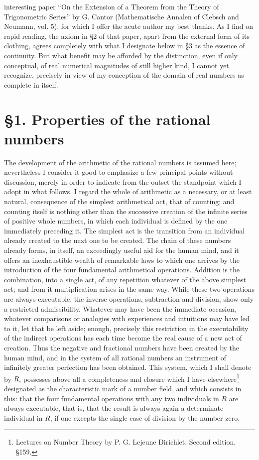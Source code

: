 \documentclass[11pt]{article}
\begin{document}
interesting paper ``On the Extension of a Theorem from the Theory of Trigonometric Series'' by G. Cantor (Mathematische Annalen of Clebsch and Neumann, vol. 5), for which I offer the acute author my best thanks. As I find on rapid reading, the axiom in \S 2 of that paper, apart from the external form of its clothing, agrees completely with what I designate below in \S 3 as the essence of continuity. But what benefit may be afforded by the distinction, even if only conceptual, of real numerical magnitudes of still higher kind, I cannot yet recognize, precisely in view of my conception of the domain of real numbers as complete in itself.

\section*{\S 1. Properties of the rational numbers}

The development of the arithmetic of the rational numbers is assumed here; nevertheless I consider it good to emphasize a few principal points without discussion, merely in order to indicate from the outset the standpoint which I adopt in what follows. I regard the whole of arithmetic as a necessary, or at least natural, consequence of the simplest arithmetical act, that of counting; and counting itself is nothing other than the successive creation of the infinite series of positive whole numbers, in which each individual is defined by the one immediately preceding it. The simplest act is the transition from an individual already created to the next one to be created. The chain of these numbers already forms, in itself, an exceedingly useful aid for the human mind, and it offers an inexhaustible wealth of remarkable laws to which one arrives by the introduction of the four fundamental arithmetical operations. Addition is the combination, into a single act, of any repetition whatever of the above simplest act; and from it multiplication arises in the same way. While these two operations are always executable, the inverse operations, subtraction and division, show only a restricted admissibility. Whatever may have been the immediate occasion, whatever comparisons or analogies with experiences and intuitions may have led to it, let that be left aside; enough, precisely this restriction in the executability of the indirect operations has each time become the real cause of a new act of creation. Thus the negative and fractional numbers have been created by the human mind, and in the system of all rational numbers an instrument of infinitely greater perfection has been obtained. This system, which I shall denote by $R$, possesses above all a completeness and closure which I have elsewhere\footnote{Lectures on Number Theory by P. G. Lejeune Dirichlet. Second edition. \S 159.} designated as the characteristic mark of a number field, and which consists in this: that the four fundamental operations with any two individuals in $R$ are always executable, that is, that the result is always again a determinate individual in $R$, if one excepts the single case of division by the number zero.
\end{document}
